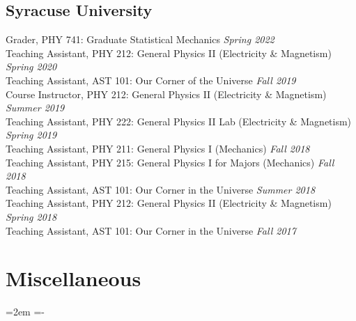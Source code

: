 \documentclass[10pt,article,oneside]{memoir}
\def\hangpars{%
  \leftskip=2em%
  \parindent=-\leftskip%
  \setsecindent{-\leftskip}%
  \setsubsecindent{-\leftskip}%
  \parskip=0.5pt
}
\begin{document}
\subsection{Syracuse University}


Grader, PHY 741: Graduate Statistical Mechanics                                              \hfill \emph{Spring 2022} \\
Teaching Assistant, PHY 212: General Physics II (Electricity \& Magnetism)                   \hfill \emph{Spring 2020} \\
Teaching Assistant, AST 101: Our Corner of the Universe                                      \hfill \emph{Fall 2019}   \\
Course Instructor, PHY 212: General Physics II (Electricity \& Magnetism)                    \hfill \emph{Summer 2019} \\
Teaching Assistant, PHY 222: General Physics II Lab (Electricity \& Magnetism)               \hfill \emph{Spring 2019} \\
Teaching Assistant, PHY 211: General Physics I (Mechanics)                                   \hfill \emph{Fall 2018}   \\
Teaching Assistant, PHY 215: General Physics I for Majors (Mechanics)                        \hfill \emph{Fall 2018}   \\
Teaching Assistant, AST 101: Our Corner in the Universe                                      \hfill \emph{Summer 2018} \\
Teaching Assistant, PHY 212: General Physics II (Electricity \& Magnetism)                   \hfill \emph{Spring 2018} \\
Teaching Assistant, AST 101: Our Corner in the Universe                                      \hfill \emph{Fall 2017}



\section{Miscellaneous}

\hangpars
\end{document}
